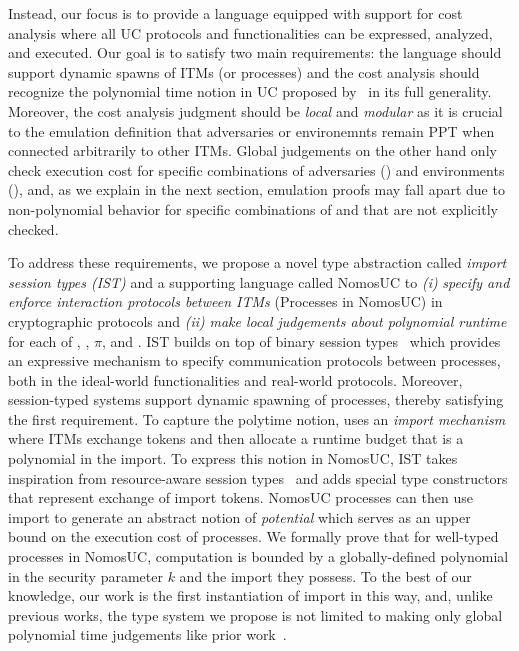 Instead, our focus is to provide a language equipped with support for cost analysis where all UC protocols
and functionalities can be expressed, analyzed, and executed.
Our goal is to satisfy two main requirements: the language should support dynamic spawns of ITMs (or processes)
and the cost analysis should recognize the polynomial time notion in UC proposed by~\cite{canettiUC} in its
full generality.
Moreover, the cost analysis judgment should be \emph{local} and \emph{modular} as it is crucial to the emulation
definition that adversaries or environemnts remain PPT when connected arbitrarily to other ITMs.
Global judgements on the other hand only check execution cost for specific combinations of adversaries (\A) and environments (\Z),
and, as we explain in the next section, emulation proofs may fall apart due to non-polynomial behavior for specific
combinations of \Z and \A that are not explicitly checked.

To address these requirements, we propose a novel type abstraction called \emph{import session types (IST)} and
a supporting language called NomosUC to 
\emph{(i)} \emph{specify and enforce interaction protocols between ITMs} (Processes in NomosUC) in cryptographic protocols and 
\emph{(ii)} \emph{make local judgements about polynomial runtime} for each of \A, \F, $\pi$, and \Z.
IST builds on top of binary session types~\cite{HondaCONCUR1993,HondaESOP1998,HondaPOPL2008,caires2010session,ToninhoESOP2013}
which provides an expressive mechanism to specify communication protocols between processes, both in the ideal-world
functionalities and real-world protocols.
Moreover, session-typed systems support dynamic spawning of processes, thereby satisfying the first requirement.
To capture the polytime notion, \cite{canettiUC} uses an \emph{import mechanism} where ITMs exchange tokens and
then allocate a runtime budget that is a polynomial in the import.
To express this notion in NomosUC, IST takes inspiration from resource-aware session types~\cite{das2018work,dasnomos,Das20arxiv}
and adds special type constructors that represent exchange of import tokens.
NomosUC processes can then use import to generate an abstract notion of \emph{potential} which serves as an upper
bound on the execution cost of processes.
We formally prove that for well-typed processes in NomosUC, computation is bounded by a globally-defined polynomial
in the security parameter $k$ and the import they possess.
To the best of our knowledge, our work is the first instantiation of import in this way, and, unlike previous works,
the type system we propose is not limited to making only global polynomial time judgements like prior work~\cite{ilc, ipdl}.


